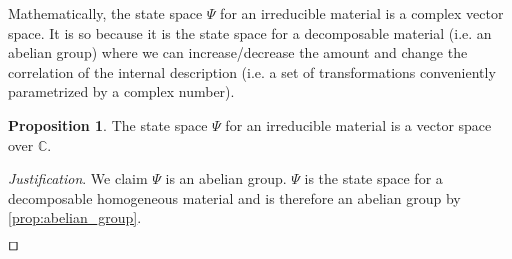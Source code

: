 \documentclass[smallextended]{svjour3}
\numberwithin{equation}{section}
\newenvironment{justification}{\emph{Justification}.}{\hfill\(\qed\)}
\theoremstyle{definition}
\newtheorem{prop}[equation]{Proposition}
\newenvironment{justification}{\emph{Justification}.}{\qed}
\begin{document}
Mathematically, the state space $\Psi$ for an irreducible material is a complex vector space. It is so because it is the state space for a decomposable material (i.e. an abelian group) where we can increase/decrease the amount and change the correlation of the internal description (i.e. a set of transformations conveniently parametrized by a complex number).

\begin{prop}\label{prop:complex_vector_space}
	The state space $\Psi$ for an irreducible material is a vector space over $\mathbb{C}$.
\end{prop}

\begin{justification}
	We claim $\Psi$ is an abelian group. $\Psi$ is the state space for a decomposable homogeneous material and is therefore an abelian group  by \ref{prop:abelian_group}.
	

\end{justification}
\end{document}
